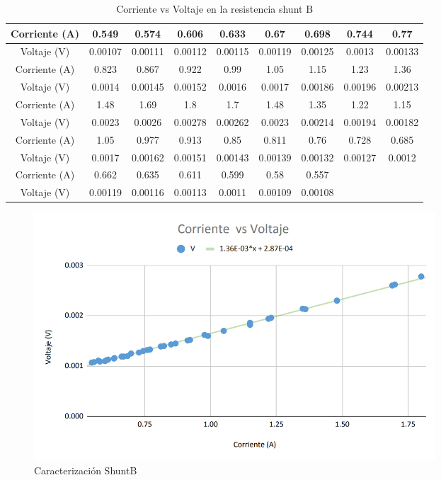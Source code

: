 \begin{table} [H]
    \begin{center}
    \begin{tabular}{ |c|c|c|c|c|c|c|c|c| }
        \hline
        Corriente (A) & 0.549 & 0.574 & 0.606 & 0.633 & 0.67 & 0.698 & 0.744 & 0.77\\
        \hline
        Voltaje (V) & 0.00107 & 0.00111 & 0.00112 & 0.00115 & 0.00119 & 0.00125 & 0.0013 & 0.00133\\
        \hline
        \hline
        Corriente (A) & 0.823 & 0.867 & 0.922 & 0.99 & 1.05 & 1.15 & 1.23 & 1.36\\
        \hline
        Voltaje (V) & 0.0014 & 0.00145 & 0.00152 & 0.0016 & 0.0017 & 0.00186 & 0.00196 & 0.00213\\
        \hline
        \hline
        Corriente (A) & 1.48 & 1.69 & 1.8 & 1.7 & 1.48 & 1.35 & 1.22 & 1.15\\
        \hline
        Voltaje (V) & 0.0023 & 0.0026 & 0.00278 & 0.00262 & 0.0023 & 0.00214 & 0.00194 & 0.00182\\
        \hline
        \hline
        Corriente (A) & 1.05 & 0.977 & 0.913 & 0.85 & 0.811 & 0.76 & 0.728 & 0.685\\
        \hline
        Voltaje (V) & 0.0017 & 0.00162 & 0.00151 & 0.00143 & 0.00139 & 0.00132 & 0.00127 & 0.0012\\
        \hline
        \hline
        Corriente (A) & 0.662 & 0.635 & 0.611 & 0.599 & 0.58 & 0.557\\
        \hline
        Voltaje (V) & 0.00119 & 0.00116 & 0.00113 & 0.0011 & 0.00109 & 0.00108\\
        \hline
    \end{tabular}
\end{center}
\caption{Corriente vs Voltaje en la resistencia shunt B}
\label{tab:shuntB}
\end{table}
\begin{figure}[H]
    \begin{center}
    \includegraphics[width = 15cm]{3Proyecto/CorrienteVoltaje2.png}
    \caption{ Caracterización ShuntB} 
    \label{fig:Muestras shuntB}
    \end{center}
\end{figure}



